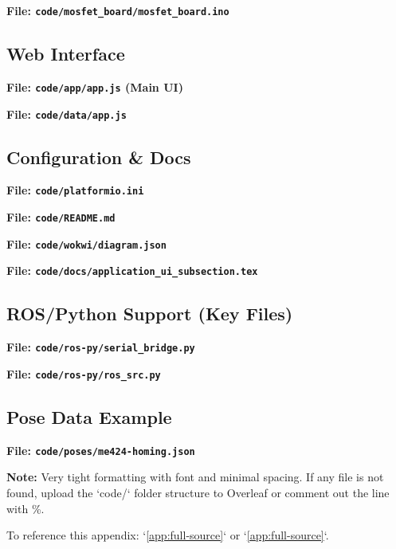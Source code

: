 

\textbf{File: \texttt{code/mosfet\_board/mosfet\_board.ino}}



\subsection*{Web Interface}

\textbf{File: \texttt{code/app/app.js} (Main UI)}



\textbf{File: \texttt{code/data/app.js}}



\subsection*{Configuration \& Docs}

\textbf{File: \texttt{code/platformio.ini}}



\textbf{File: \texttt{code/README.md}}



\textbf{File: \texttt{code/wokwi/diagram.json}}



\textbf{File: \texttt{code/docs/application_ui_subsection.tex}}



\subsection*{ROS/Python Support (Key Files)}

\textbf{File: \texttt{code/ros-py/serial_bridge.py}}



\textbf{File: \texttt{code/ros-py/ros_src.py}}



\subsection*{Pose Data Example}

\textbf{File: \texttt{code/poses/me424-homing.json}}



\vspace{0.5em}
\noindent \textbf{Note:} Very tight formatting with \scriptsize font and minimal spacing. If any file is not found, upload the `code/` folder structure to Overleaf or comment out the line with \%. 

To reference this appendix: `\ref{app:full-source}` or `\autoref{app:full-source}`.
